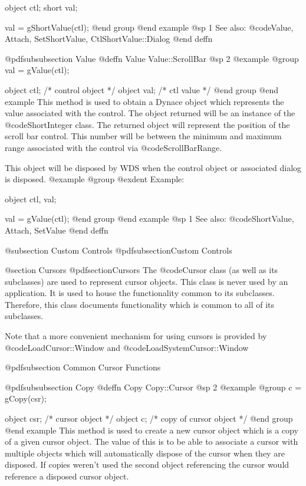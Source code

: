 object  ctl;
short   val;

val = gShortValue(ctl);
@end group
@end example
@sp 1
See also:  @code{Value, Attach, SetShortValue, CtlShortValue::Dialog}
@end deffn









@pdfsubsubsection {Value}
@deffn {Value} Value::ScrollBar
@sp 2
@example
@group
val = gValue(ctl);

object  ctl;   /*  control object  */
object  val;   /*  ctl value       */
@end group
@end example
This method is used to obtain a Dynace object which represents the value
associated with the control.  The object returned will be an instance of
the @code{ShortInteger} class.  The returned object will represent
the position of the scroll bar control.  This number will be between
the minimum and maximum range associated with the control via
@code{ScrollBarRange}.

This object will be disposed by WDS when the control object or
associated dialog is disposed.
@example
@group
@exdent Example:

object  ctl, val;

val = gValue(ctl);
@end group
@end example
@sp 1
See also:  @code{ShortValue, Attach, SetValue}
@end deffn









@subsection Custom Controls
@pdfsubsection{Custom Controls}


@section Cursors
@pdfsection{Cursors}
The @code{Cursor} class (as well as its subclasses) are used to represent
cursor objects.  This class is never used by an application.  It is used
to house the functionality common to its subclasses.  Therefore, this
class documents functionality which is common to all of its subclasses.

Note that a more convenient mechanism for using cursors is provided by
@code{LoadCursor::Window} and @code{LoadSystemCursor::Window}







@pdfsubsection {Common Cursor Functions}


@pdfsubsubsection {Copy}
@deffn {Copy} Copy::Cursor
@sp 2
@example
@group
c = gCopy(csr);

object  csr;    /*  cursor object          */
object  c;      /*  copy of cursor object  */
@end group
@end example
This method is used to create a new cursor object which is a copy of a
given cursor object.  The value of this is to be able to associate a
cursor with multiple objects which will automatically dispose of the
cursor when they are disposed.  If copies weren't used the second object
referencing the cursor would reference a disposed cursor object.


